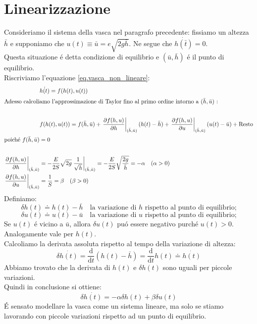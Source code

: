 \documentclass[../main.tex]{subfiles}
\begin{document}
	\section{Linearizzazione}
		Consideriamo il sistema della vasca nel paragrafo precedente: fissiamo un altezza $ \bar{h} $ e supponiamo che $u(t) \equiv \bar{u} = e \sqrt{2g \bar{h}}$. Ne segue che $ \dot{h(\bar{t})} =0 $.\\
		Questa situazione \'e detta condizione di equilibrio e $( \bar{u} , \bar{h}) $ \'e il punto di equilibrio.\\
		Riscriviamo l'equazione \ref{eq.vasca_non_lineare}:
		\begin{align*}	
				&\dot{h(t)} = f(h(t),u(t))\\		
				\intertext{Adesso calcoliamo l'approssimazione di Taylor fino al primo ordine intorno a $ (\bar{h},\bar{u}) $ :} \\
				&f(h(t),u(t)) = f(\bar{h},\bar{u}) + \left. \frac{\partial f(h,u)}{\partial h} \right|_{(\bar{h},\bar{u})} (h(t) - \bar{h}) + \left. \frac{\partial f(h,u)}{\partial u} \right|_{(\bar{h},\bar{u})} (u(t) - \bar{u}) + \mbox{Resto}\\
				\intertext{poich\'e $ f(\bar{h},\bar{u}) =0$}\\
				\left. \frac{\partial f(h,u)}{\partial h} \right|_{(\bar{h},\bar{u})} &= - \frac{E}{2S} \sqrt{2g} \left. \frac{1}{\sqrt{h}} \right|_{(\bar{h},\bar{u})} = - \frac{E}{2S} \sqrt{\frac{2g}{\bar{h}}} = - \alpha \quad (\alpha > 0)\\
				\left. \frac{\partial f(h,u)}{\partial u} \right|_{(\bar{h},\bar{u})} &= \frac{1}{S} = \beta \quad (\beta > 0)  
		\end{align*}
		Definiamo:
		\[ \delta h(t) \doteq h(t)- \bar{h} \quad \text{la variazione di $h$ rispetto al punto di equilibrio;} \]
		\[ \delta u(t) \doteq u(t)- \bar{u} \quad \text{la variazione di $u$ rispetto al punto di equilibrio;} \]
		Se $u(t)$ \'e vicino a $\bar{u}$, allora $\delta u(t)$ pu\'o essere negativo purch\'e $u(t)>0$. Analogamente vale per $h(t)$.\\
		Calcoliamo la derivata assoluta rispetto al tempo della variazione di altezza:
		\[ \delta \dot{h(t)} = \frac{\mathrm{d}}{\mathrm{d} t}(h(t)-\bar{h}) = \frac{\mathrm{d}}{\mathrm{d} t}h(t) \doteq \dot{h(t)} \] 
		Abbiamo trovato che la derivata di $h(t)$ e $\delta h(t)$ sono uguali per piccole variazioni.\\
		Quindi in conclusione si ottiene:
		\begin{equation}
			\delta \dot{h(t)} = -\alpha \delta h(t) + \beta \delta u(t)
		\end{equation}
		\'E sensato modellare la vasca come un sistema lineare, ma solo se stiamo lavorando con piccole variazioni rispetto ad un punto di equilibrio.
\end{document}
